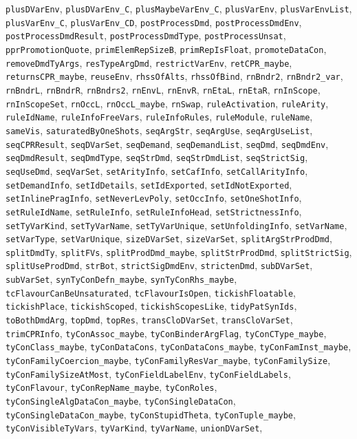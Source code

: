 \texttt{plusDVarEnv}, \texttt{plusDVarEnv_C}, \texttt{plusMaybeVarEnv_C}, \texttt{plusVarEnv}, \texttt{plusVarEnvList}, \texttt{plusVarEnv_C}, \texttt{plusVarEnv_CD}, \texttt{postProcessDmd}, \texttt{postProcessDmdEnv}, \texttt{postProcessDmdResult}, \texttt{postProcessDmdType}, \texttt{postProcessUnsat}, \texttt{pprPromotionQuote}, \texttt{primElemRepSizeB}, \texttt{primRepIsFloat}, \texttt{promoteDataCon}, \texttt{removeDmdTyArgs}, \texttt{resTypeArgDmd}, \texttt{restrictVarEnv}, \texttt{retCPR_maybe}, \texttt{returnsCPR_maybe}, \texttt{reuseEnv}, \texttt{rhssOfAlts}, \texttt{rhssOfBind}, \texttt{rnBndr2}, \texttt{rnBndr2_var}, \texttt{rnBndrL}, \texttt{rnBndrR}, \texttt{rnBndrs2}, \texttt{rnEnvL}, \texttt{rnEnvR}, \texttt{rnEtaL}, \texttt{rnEtaR}, \texttt{rnInScope}, \texttt{rnInScopeSet}, \texttt{rnOccL}, \texttt{rnOccL_maybe}, \texttt{rnSwap}, \texttt{ruleActivation}, \texttt{ruleArity}, \texttt{ruleIdName}, \texttt{ruleInfoFreeVars}, \texttt{ruleInfoRules}, \texttt{ruleModule}, \texttt{ruleName}, \texttt{sameVis}, \texttt{saturatedByOneShots}, \texttt{seqArgStr}, \texttt{seqArgUse}, \texttt{seqArgUseList}, \texttt{seqCPRResult}, \texttt{seqDVarSet}, \texttt{seqDemand}, \texttt{seqDemandList}, \texttt{seqDmd}, \texttt{seqDmdEnv}, \texttt{seqDmdResult}, \texttt{seqDmdType}, \texttt{seqStrDmd}, \texttt{seqStrDmdList}, \texttt{seqStrictSig}, \texttt{seqUseDmd}, \texttt{seqVarSet}, \texttt{setArityInfo}, \texttt{setCafInfo}, \texttt{setCallArityInfo}, \texttt{setDemandInfo}, \texttt{setIdDetails}, \texttt{setIdExported}, \texttt{setIdNotExported}, \texttt{setInlinePragInfo}, \texttt{setNeverLevPoly}, \texttt{setOccInfo}, \texttt{setOneShotInfo}, \texttt{setRuleIdName}, \texttt{setRuleInfo}, \texttt{setRuleInfoHead}, \texttt{setStrictnessInfo}, \texttt{setTyVarKind}, \texttt{setTyVarName}, \texttt{setTyVarUnique}, \texttt{setUnfoldingInfo}, \texttt{setVarName}, \texttt{setVarType}, \texttt{setVarUnique}, \texttt{sizeDVarSet}, \texttt{sizeVarSet}, \texttt{splitArgStrProdDmd}, \texttt{splitDmdTy}, \texttt{splitFVs}, \texttt{splitProdDmd_maybe}, \texttt{splitStrProdDmd}, \texttt{splitStrictSig}, \texttt{splitUseProdDmd}, \texttt{strBot}, \texttt{strictSigDmdEnv}, \texttt{strictenDmd}, \texttt{subDVarSet}, \texttt{subVarSet}, \texttt{synTyConDefn_maybe}, \texttt{synTyConRhs_maybe}, \texttt{tcFlavourCanBeUnsaturated}, \texttt{tcFlavourIsOpen}, \texttt{tickishFloatable}, \texttt{tickishPlace}, \texttt{tickishScoped}, \texttt{tickishScopesLike}, \texttt{tidyPatSynIds}, \texttt{toBothDmdArg}, \texttt{topDmd}, \texttt{topRes}, \texttt{transCloDVarSet}, \texttt{transCloVarSet}, \texttt{trimCPRInfo}, \texttt{tyConAssoc_maybe}, \texttt{tyConBinderArgFlag}, \texttt{tyConCType_maybe}, \texttt{tyConClass_maybe}, \texttt{tyConDataCons}, \texttt{tyConDataCons_maybe}, \texttt{tyConFamInst_maybe}, \texttt{tyConFamilyCoercion_maybe}, \texttt{tyConFamilyResVar_maybe}, \texttt{tyConFamilySize}, \texttt{tyConFamilySizeAtMost}, \texttt{tyConFieldLabelEnv}, \texttt{tyConFieldLabels}, \texttt{tyConFlavour}, \texttt{tyConRepName_maybe}, \texttt{tyConRoles}, \texttt{tyConSingleAlgDataCon_maybe}, \texttt{tyConSingleDataCon}, \texttt{tyConSingleDataCon_maybe}, \texttt{tyConStupidTheta}, \texttt{tyConTuple_maybe}, \texttt{tyConVisibleTyVars}, \texttt{tyVarKind}, \texttt{tyVarName}, \texttt{unionDVarSet}, 